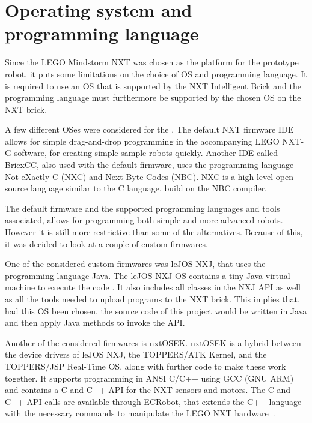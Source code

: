 \section{Operating system and programming language} \label{sec:os_and_proglanguage}
Since the LEGO Mindstorm NXT was chosen as the platform for the prototype robot, it puts some limitations on the choice of OS and programming language. It is required to use an OS that is supported by the NXT Intelligent Brick and the programming language must furthermore be supported by the chosen OS on the NXT brick.

A few different OSes were considered for the \projname{}. The default NXT firmware IDE allows for simple drag-and-drop programming in the accompanying LEGO NXT-G software, for creating simple sample robots quickly. Another IDE called BricxCC, also used with the default firmware, uses the programming language Not eXactly C (NXC) and Next Byte Codes (NBC). NXC is a high-level open-source language similar to the C language, build on the NBC compiler. 


The default firmware and the supported programming languages and tools associated, allows for programming both simple and more advanced robots. However it is still more restrictive than some of the alternatives. Because of this, it was decided to look at a couple of custom firmwares.  

One of the considered custom firmwares was leJOS NXJ, that uses the programming language Java. The leJOS NXJ OS contains a tiny Java virtual machine to execute the code \citep{lejos}. It also includes all classes in the NXJ API \citep{nxj} as well as all the tools needed to upload programs to the NXT brick. This implies that, had this OS been chosen, the source code of this project would be written in Java and then apply Java methods to invoke the API.

Another of the considered firmwares is nxtOSEK. nxtOSEK is a hybrid between the device drivers of leJOS NXJ, the TOPPERS/ATK Kernel, and the TOPPERS/JSP Real-Time OS, along with further code to make these work together. It supports programming in ANSI C/C++ using GCC (GNU ARM) and contains a C and C++ API for the NXT sensors and motors. The C and C++ API calls are available through ECRobot, that extends the C++ language with the necessary commands to manipulate the LEGO NXT hardware~\citep{nxtosek, toppers_atk, toppers_jsp, nxtOSEK2, nxtosek_api}.

